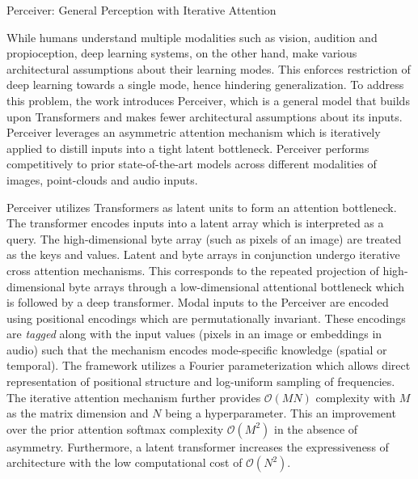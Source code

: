 \documentclass[11pt,letterpaper]{article}
\begin{document}
\begin{center}
  \large{Perceiver: General Perception with Iterative Attention}
\end{center}

While humans understand multiple modalities such as vision, audition and propioception, deep learning systems, on the other hand, make various architectural assumptions about their learning modes. This enforces restriction of deep learning towards a single mode, hence hindering generalization. To address this problem, the work introduces Perceiver, which is a general model that builds upon Transformers and makes fewer architectural assumptions about its inputs. Perceiver leverages an asymmetric attention mechanism which is iteratively applied to distill inputs into a tight latent bottleneck. Perceiver performs competitively to prior state-of-the-art models across different modalities of images, point-clouds and audio inputs.

Perceiver utilizes Transformers as latent units to form an attention bottleneck. The transformer encodes inputs into a latent array which is interpreted as a query. The high-dimensional byte array (such as pixels of an image) are treated as the keys and values. Latent and byte arrays in conjunction undergo iterative cross attention mechanisms. This corresponds to the repeated projection of high-dimensional byte arrays through a low-dimensional attentional bottleneck which is followed by a deep transformer. Modal inputs to the Perceiver are encoded using positional encodings which are permutationally invariant. These encodings are \textit{tagged} along with the input values (pixels in an image or embeddings in audio) such that the mechanism encodes mode-specific knowledge (spatial or temporal). The framework utilizes a Fourier parameterization which allows direct representation of positional structure and log-uniform sampling of frequencies. The iterative attention mechanism further provides $\mathcal{O}(MN)$ complexity with $M$ as the matrix dimension and $N$ being a hyperparameter. This an improvement over the prior attention softmax complexity $\mathcal{O}(M^{2})$ in the absence of asymmetry. Furthermore, a latent transformer increases the expressiveness of architecture with the low computational cost of $\mathcal{O}(N^{2})$.
\end{document}
